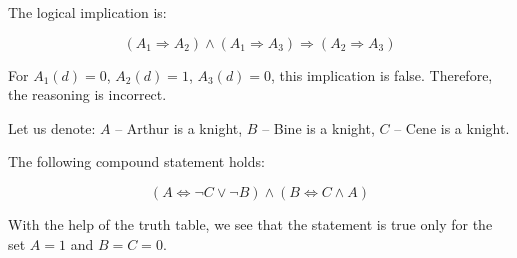 \begin{answer}{1.4}
The logical implication is:

\[
(A_1 \Rightarrow A_2) \land (A_1 \Rightarrow A_3) \Rightarrow (A_2 \Rightarrow A_3)
\]

For \( A_1(d) = 0 \), \( A_2(d) = 1 \), \( A_3(d) = 0 \), this implication is false. Therefore, the reasoning is incorrect.
\end{answer}
\begin{answer}{1.11}

Let us denote: $A$ – Arthur is a knight, $B$ – Bine is a knight, $C$ – Cene is a knight.

The following compound statement holds:

\[
(A \iff \neg C \lor \neg B) \land (B \iff C \land A)
\]

With the help of the truth table, we see that the statement is true only for the set $A = 1$ and $B = C = 0$.
\end{answer}

